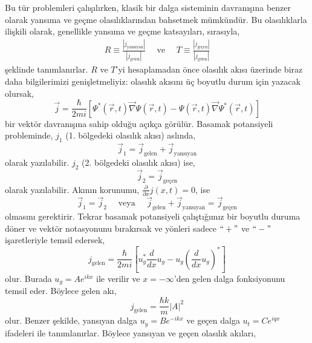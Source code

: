 \documentclass[a4paper,12pt, twoside]{article}
\begin{document}
Bu tür problemleri çalışılırken, klasik bir dalga sisteminin davranışına benzer olarak yansıma ve geçme olasılıklarından bahsetmek mümkündür. Bu olasılıklarla ilişkili olarak, genellikle yansıma ve geçme katsayıları, sırasıyla,
\begin{align}
R \equiv \frac{|j_\text{yansıyan}|}{|j_\text{gelen}|} \quad \text{ ve } \quad
T \equiv \frac{|j_\text{geçen}|}{|j_\text{gelen}|}
\end{align}
şeklinde tanımlanırlar. $R$ ve $T$'yi hesaplamadan önce olasılık akısı üzerinde biraz daha bilgilerimizi genişletmeliyiz: olasılık akısını üç boyutlu durum için yazacak olursak,
\begin{equation}
\vec j = \frac{\hbar}{2 m i} \left[
\Psi^*(\vec r, t) \vec \nabla \Psi(\vec r, t) - 
\Psi(\vec r, t) \vec \nabla \Psi^*(\vec r, t)
\right]
\end{equation}
bir vektör davranışına sahip olduğu açıkça görülür. Basamak potansiyeli probleminde, $j_1$ (1. bölgedeki olasılık akısı) aslında,
\begin{equation}
\vec j_1 = \vec j_\text{gelen} + \vec j_\text{yansıyan}
\end{equation}
olarak yazılabilir. $j_2$  (2. bölgedeki olasılık akısı) ise,
\begin{equation}
\vec j_2 = \vec j_\text{geçen}
\end{equation}
olarak yazılabilir. Akının korunumu, $\frac { \partial } { \partial x } j ( x , t ) = 0$, ise
\begin{equation}
\vec j_1 = \vec j_2 \quad \text{ veya } \quad \vec j_\text{gelen} + \vec j_\text{yansıyan} = \vec j_\text{geçen}
\end{equation}
olmasını gerektirir. Tekrar basamak potansiyeli çalıştığımız bir boyutlu duruma döner ve vektör notasyonunu bırakırsak ve yönleri sadece $``+"$ ve $``-"$  işaretleriyle temsil edersek,
\begin{equation}
j_\text{gelen} =  \frac{\hbar}{2 m i} \left[u^*_g \frac{d}{dx}u_g - u_g (\frac{d}{dx}u_g)^*\right]
\end{equation}
olur. Burada $u_g = A e ^ { i k x } $ ile verilir ve $x=-\infty$'den gelen dalga fonksiyonunu temsil eder. Böylece gelen akı,
\begin{equation}
j_\text{gelen} =  \frac{\hbar k}{m} |A|^2
\end{equation}
olur. Benzer şekilde, yansıyan dalga $u_y = B e ^ { -i k x } $ ve geçen dalga $u_t = C e ^ { i q x } $ ifadeleri ile tanımlanırlar. Böylece yansıyan ve geçen olasılık akıları,
\end{document}
